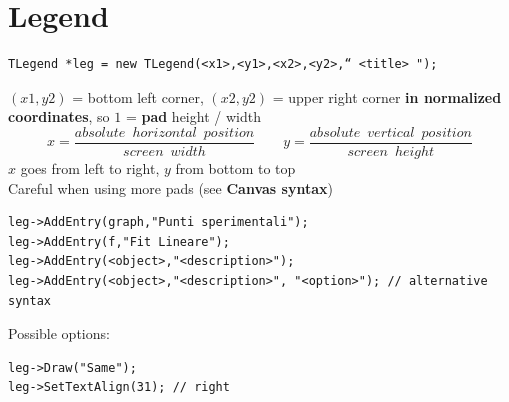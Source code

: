 \documentclass[10pt, oneside]{article}
\begin{document}
\section{Legend}
\begin{verbatim}
TLegend *leg = new TLegend(<x1>,<y1>,<x2>,<y2>,“ <title> ");
\end{verbatim}
$(x1,y2)$ = bottom left corner, $(x2,y2)$ = upper right corner \textbf{in normalized coordinates}, so $1$ = \textbf{pad} height / width
\[x = \frac{absolute \enspace horizontal \enspace position}{screen \enspace width} \qquad y = \frac{absolute \enspace vertical \enspace position}{screen \enspace height}\]
$x$ goes from left to right, $y$ from bottom to top\\
Careful when using more pads (see\textbf{ Canvas syntax})
\begin{verbatim}
leg->AddEntry(graph,"Punti sperimentali"); 
leg->AddEntry(f,"Fit Lineare"); 
leg->AddEntry(<object>,"<description>");
leg->AddEntry(<object>,"<description>", "<option>"); // alternative syntax
\end{verbatim}
Possible options:
\begin{verbatim}
leg->Draw("Same"); 
leg->SetTextAlign(31); // right
\end{verbatim}
\end{document}
